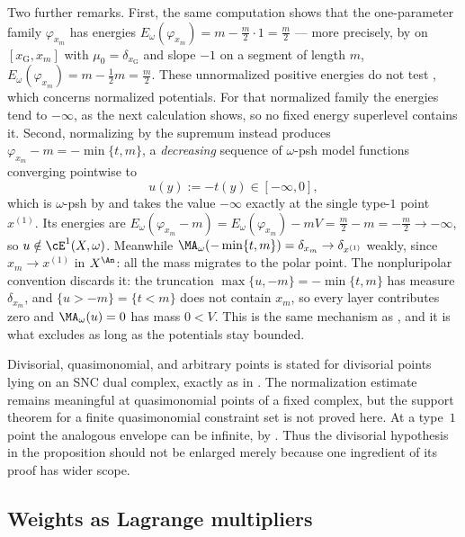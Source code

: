 \begin{example}
Two further remarks.  First, the same computation shows that the
one-parameter family $\varphi_{x_m}$ has energies
$E_\omega(\varphi_{x_m})=m-\tfrac m2\cdot1=\tfrac m2$ --- more precisely,
by  on $[x_{\mathrm G},x_m]$ with
$\mu_0=\delta_{x_{\mathrm G}}$ and slope $-1$ on a segment of length
$m$, $E_\omega(\varphi_{x_m})=m-\tfrac12m=\tfrac m2$.
These unnormalized positive energies do not test
, which concerns normalized potentials.
For that normalized family the energies tend to $-\infty$, as the next
calculation shows, so no fixed energy superlevel contains it.  Second, normalizing by the supremum instead produces
$\varphi_{x_m}-m=-\min\{t,m\}$, a \emph{decreasing} sequence of
$\omega$-psh model functions converging pointwise to
\[
 u(y):=-t(y)\in[-\infty,0],
\]
which is $\omega$-psh by  and takes
the value $-\infty$ exactly at the single type-$1$ point $x^{(1)}$.
Its energies are
$E_\omega(\varphi_{x_m}-m)=E_\omega(\varphi_{x_m})-mV=\tfrac m2-m
 =-\tfrac m2\to-\infty$, so $u\notin\cE^1(X,\omega)$.  Meanwhile
$\MA_\omega(-\min\{t,m\})=\delta_{x_m}\to\delta_{x^{(1)}}$ weakly, since
$x_m\to x^{(1)}$ in $X^{\An}$: all the mass migrates to the polar point.
The nonpluripolar convention  discards it: the
truncation $\max\{u,-m\}=-\min\{t,m\}$ has measure $\delta_{x_m}$, and
$\{u>-m\}=\{t<m\}$ does not contain $x_m$, so every layer contributes
zero and $\MA_\omega(u)=0$ has mass $0<V$.  This is the same mechanism as
, and it is what
 excludes as long as the potentials
stay bounded.
\end{example}

\begin{warning}{Divisorial, quasimonomial, and arbitrary points}
 is stated for divisorial points lying on an
SNC dual complex, exactly as in \cite[Lemma~8.5 and
Proposition~8.6]{BFJ15}.  The normalization estimate remains meaningful at
quasimonomial points of a fixed complex, but the support theorem for a
finite quasimonomial constraint set is not proved here.  At a type~$1$
point the analogous envelope can be infinite, by
.  Thus the divisorial hypothesis in the
proposition should not be enlarged merely because one ingredient of its
proof has wider scope.
\end{warning}

\subsection{Weights as Lagrange multipliers}
\label{sec:ch31-multipliers}

